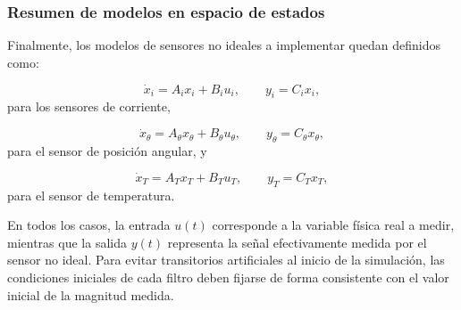 \documentclass[12pt, a4paper,journal, onecolumn, compsoc]{IEEEtran}
\begin{document}
\subsubsection*{Resumen de modelos en espacio de estados}

Finalmente, los modelos de sensores no ideales a implementar quedan definidos como:

\begin{equation}
    \dot{x}_i=A_i x_i + B_i u_i, \qquad y_i=C_i x_i,
\end{equation}
para los sensores de corriente,

\begin{equation}
    \dot{x}_\theta=A_\theta x_\theta + B_\theta u_\theta, \qquad y_\theta=C_\theta x_\theta,
\end{equation}
para el sensor de posición angular, y

\begin{equation}
    \dot{x}_T=A_T x_T + B_T u_T, \qquad y_T=C_T x_T,
\end{equation}
para el sensor de temperatura.

En todos los casos, la entrada $u(t)$ corresponde a la variable física real a medir, mientras que la salida $y(t)$ representa la señal efectivamente medida por el sensor no ideal. Para evitar transitorios artificiales al inicio de la simulación, las condiciones iniciales de cada filtro deben fijarse de forma consistente con el valor inicial de la magnitud medida.
\end{document}
